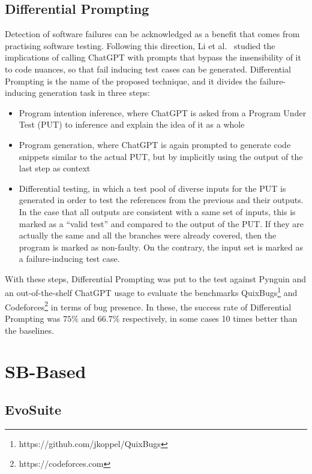 \documentclass[%
  chapterprefix=false,%
  open=right,%
  twoside=true,%
  paper=a4,%
  logofile={Figures/logo.png},%
  thesistype=master,%
  UKenglish,%
]{se2thesis}
\begin{document}
\subsection{Differential Prompting}

Detection of software failures can be acknowledged as a benefit that comes from practising software testing.
Following this direction, Li et al.~\cite{li2023nuances} studied the implications of calling ChatGPT with prompts that bypass the insensibility of it to code nuances, so that fail inducing test cases can be generated.
Differential Prompting is the name of the proposed technique, and it divides the failure-inducing generation task in three steps:

\begin{itemize}
  \item Program intention inference, where ChatGPT is asked from a Program Under Test (PUT) to inference and explain the idea of it as a whole
  \item Program generation, where ChatGPT is again prompted to generate code snippets similar to the actual PUT, but by implicitly using the output of the last step as context
  \item Differential testing, in which a test pool of diverse inputs for the PUT is generated in order to test the references from the previous and their outputs.
  In the case that all outputs are consistent with a same set of inputs, this is marked as a ``valid test'' and compared to the output of the PUT.\@
  If they are actually the same and all the branches were already covered, then the program is marked as non-faulty.
  On the contrary, the input set is marked as a failure-inducing test case.
\end{itemize}

With these steps, Differential Prompting was put to the test against Pynguin and an out-of-the-shelf ChatGPT usage to evaluate the benchmarks QuixBugs\footnote{https://github.com/jkoppel/QuixBugs} and Codeforces\footnote{https://codeforces.com} in terms of bug presence.
In these, the success rate of Differential Prompting was \(75\%\) and \(66.7\%\) respectively, in some cases 10 times better than the baselines.

\section{SB-Based}

\subsection{EvoSuite}
\end{document}
